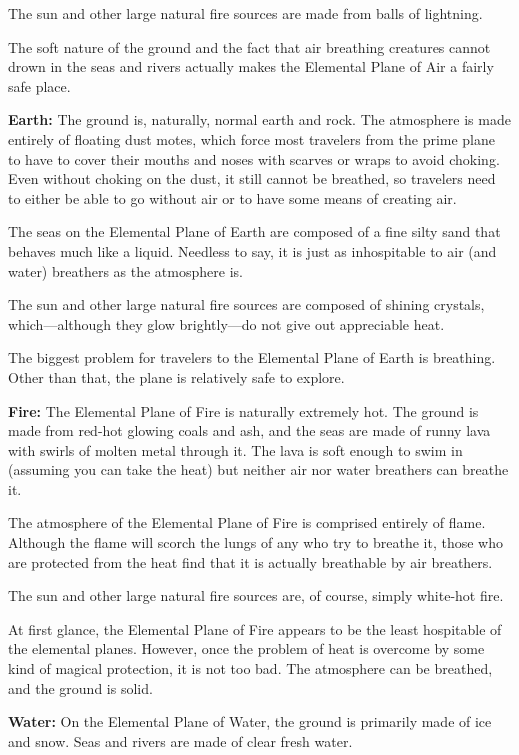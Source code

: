 \begin{multicols*}{2}
The sun and other large natural fire sources are made from balls of lightning.

The soft nature of the ground and the fact that air breathing creatures cannot drown in the seas and rivers actually makes the Elemental Plane of Air a fairly safe place.

\textbf{Earth:}\label{sec:Elemental Plane of Earth} The ground is, naturally, normal earth and rock. The atmosphere is made entirely of floating dust motes, which force most travelers from the prime plane to have to cover their mouths and noses with scarves or wraps to avoid choking. Even without choking on the dust, it still cannot be breathed, so travelers need to either be able to go without air or to have some means of creating air.

The seas on the Elemental Plane of Earth are composed of a fine silty sand that behaves much like a liquid. Needless to say, it is just as inhospitable to air (and water) breathers as the atmosphere is.

The sun and other large natural fire sources are composed of shining crystals, which—although they glow brightly—do not give out appreciable heat.

The biggest problem for travelers to the Elemental Plane of Earth is breathing. Other than that, the plane is relatively safe to explore.

\textbf{Fire:} The Elemental Plane of Fire is naturally extremely hot. The ground is made from red-hot glowing coals and ash, and the seas are made of runny lava with swirls of molten metal through it. The lava is soft enough to swim in (assuming you can take the heat) but neither air nor water breathers can breathe it.

The atmosphere of the Elemental Plane of Fire is comprised entirely of flame. Although the flame will scorch the lungs of any who try to breathe it, those who are protected from the heat find that it is actually breathable by air breathers.

The sun and other large natural fire sources are, of course, simply white-hot fire.

At first glance, the Elemental Plane of Fire appears to be the least hospitable of the elemental planes. However, once the problem of heat is overcome by some kind of magical protection, it is not too bad. The atmosphere can be breathed, and the ground is solid.

\textbf{Water:}\label{sec:Elemental Plane of Water} On the Elemental Plane of Water, the ground is primarily made of ice and snow. Seas and rivers are made of clear fresh water.


\end{multicols*}
